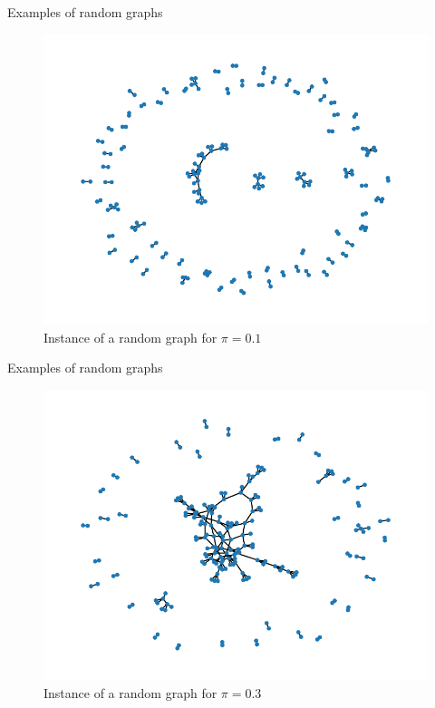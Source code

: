 \documentclass[handout]{beamer}
\begin{document}
\begin{frame}{Examples of random graphs}
    \begin{figure}
        \centering
        \includegraphics[height=.7\textheight]{rg0}
        \caption{Instance of a random graph for $\pi=0.1$}
        \label{fig:rg0}
    \end{figure}
\end{frame}

\begin{frame}{Examples of random graphs}
    \begin{figure}
        \centering
        \includegraphics[height=.7\textheight]{rg1}
        \caption{Instance of a random graph for $\pi=0.3$}
        \label{fig:rg1}
    \end{figure}
\end{frame}
\end{document}
